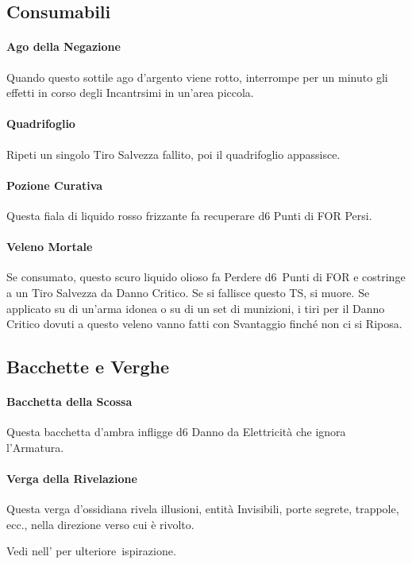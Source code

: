 \documentclass[itdr]{subfiles}
\begin{document}
\vfill

\subsection*{Consumabili}

\paragraph{Ago della Negazione}
Quando questo sottile ago d'argento viene rotto, interrompe per un minuto gli effetti in corso degli Incantrsimi in un'area piccola.

\paragraph{Quadrifoglio}
Ripeti un singolo Tiro Salvezza fallito, poi il quadrifoglio appassisce.

\paragraph{Pozione Curativa}
Questa fiala di liquido rosso frizzante fa recuperare d6 Punti di FOR Persi.

\paragraph{Veleno Mortale}
Se consumato, questo scuro liquido olioso fa Perdere d6~Punti di FOR e costringe a un Tiro Salvezza da Danno Critico. Se si fallisce questo TS, si muore. Se applicato su di un'arma idonea o su di un set di munizioni, i tiri per il Danno Critico dovuti a questo veleno vanno fatti con Svantaggio finché non ci si Riposa.

\vfill

\subsection*{Bacchette e Verghe}

\paragraph{Bacchetta della Scossa}
Questa bacchetta d'ambra infligge d6 Danno da Elettricità che \mbox{ignora} l'Armatura.

\paragraph{Verga della Rivelazione}
Questa verga d'ossidiana rivela illusioni, entità Invisibili, porte segrete, trappole, ecc., nella direzione verso cui è rivolto.

\vfill

\begin{dbox}
	Vedi \textbf{} nell'\textbf{} per \mbox{ulteriore ispirazione}.
\end{dbox}

\vfill
\end{document}
